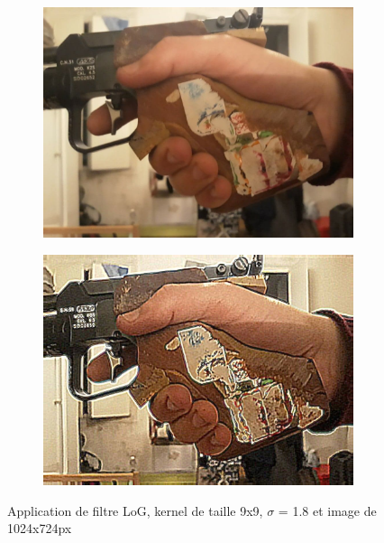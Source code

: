         \begin{figure}[!h]
            \centering
            \begin{subfigure}[b]{0.4\textwidth}
                \includegraphics[width=1\textwidth]{report_src/effects/sharpen2.jpg}
            \end{subfigure}
            \begin{subfigure}[b]{0.4\textwidth}
                \includegraphics[width=1\textwidth]{report_src/effects/org2.jpg}
            \end{subfigure}
            \caption*{Application de filtre LoG, kernel de taille 9x9, $\sigma$ = 1.8 et image de 1024x724px}
        \end{figure} 



